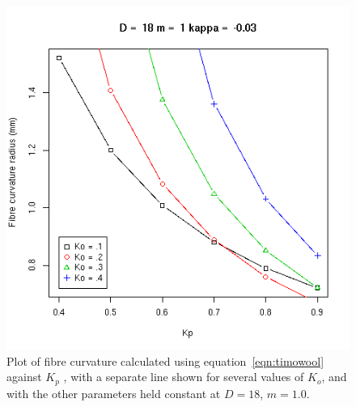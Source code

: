 %

\begin{figure}[!h]
  \centering
  \includegraphics[width=1.0\textwidth]{RvsKpm1.png}
 \caption{Plot of fibre curvature calculated using equation~\ref{eqn:timowool} against $K_{p}$ , with a separate line shown for several values of $K_{o}$, and with the other parameters held constant at $D=18$, $m=1.0$.}
  \label{fig:curvkp50}
\end{figure}

%

